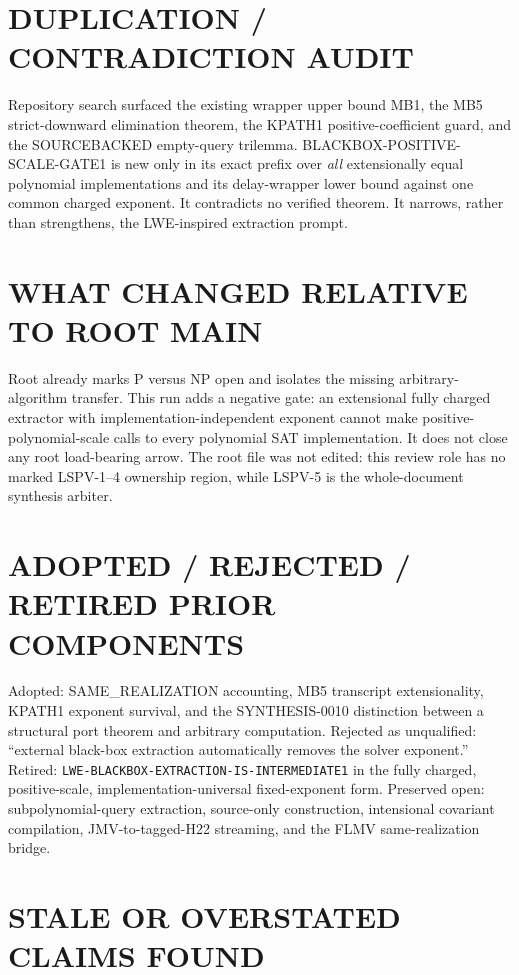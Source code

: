 \documentclass[11pt]{article}
\begin{document}
\section{DUPLICATION / CONTRADICTION AUDIT}

Repository search surfaced the existing wrapper upper bound MB1, the MB5
strict-downward elimination theorem, the KPATH1 positive-coefficient guard,
and the SOURCEBACKED empty-query trilemma.  BLACKBOX-POSITIVE-SCALE-GATE1 is
new only in its exact prefix over \emph{all} extensionally equal polynomial
implementations and its delay-wrapper lower bound against one common charged
exponent.  It contradicts no verified theorem.  It narrows, rather than
strengthens, the LWE-inspired extraction prompt.

\section{WHAT CHANGED RELATIVE TO ROOT MAIN}

Root  already marks P versus NP open and isolates the missing
arbitrary-algorithm transfer.  This run adds a negative gate: an extensional
fully charged extractor with implementation-independent exponent cannot make
positive-polynomial-scale calls to every polynomial SAT implementation.
It does not close any root load-bearing arrow.  The root file was not edited:
this review role has no marked LSPV-1--4 ownership region, while LSPV-5 is the
whole-document synthesis arbiter.

\section{ADOPTED / REJECTED / RETIRED PRIOR COMPONENTS}

Adopted: SAME\_REALIZATION accounting, MB5 transcript extensionality,
KPATH1 exponent survival, and the SYNTHESIS-0010 distinction between a
structural port theorem and arbitrary computation.  Rejected as unqualified:
``external black-box extraction automatically removes the solver exponent.''
Retired: \texttt{LWE-BLACKBOX-EXTRACTION-IS-INTERMEDIATE1} in the fully
charged, positive-scale, implementation-universal fixed-exponent form.
Preserved open: subpolynomial-query extraction, source-only construction,
intensional covariant compilation, JMV-to-tagged-H22 streaming, and the FLMV
same-realization bridge.

\section{STALE OR OVERSTATED CLAIMS FOUND}
\end{document}
